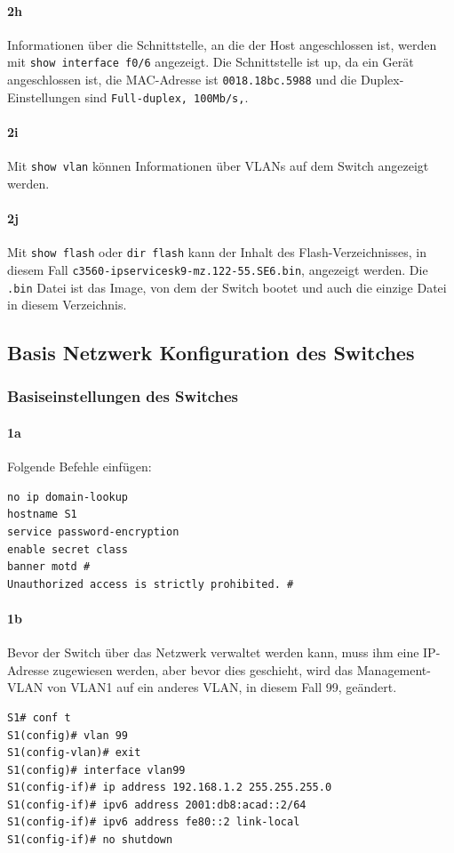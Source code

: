 \documentclass[a4paper]{article}
\newcommand{\abc}{\hfill \break}
\begin{document}
\paragraph{2h} \abc
Informationen über die Schnittstelle, an die der Host angeschlossen ist, werden mit \texttt{show interface f0/6} angezeigt.\abc
Die Schnittstelle ist up, da ein Gerät angeschlossen ist, die MAC-Adresse ist \texttt{0018.18bc.5988} und die Duplex-Einstellungen sind \texttt{Full-duplex, 100Mb/s,}. \abc
\paragraph{2i} \abc
Mit \texttt{show vlan} können Informationen über VLANs auf dem Switch angezeigt werden. \abc
\paragraph{2j} \abc
Mit \texttt{show flash} oder \texttt{dir flash} kann der Inhalt des Flash-Verzeichnisses, in diesem Fall \texttt{c3560-ipservicesk9-mz.122-55.SE6.bin}, angezeigt werden. \abc
Die \texttt{.bin} Datei ist das Image, von dem der Switch bootet und auch die einzige Datei in diesem Verzeichnis.
\subsection{Basis Netzwerk Konfiguration des Switches}
\subsubsection{Basiseinstellungen des Switches}
\paragraph {1a} \abc
Folgende Befehle einfügen:
\begin{lstlisting}
no ip domain-lookup
hostname S1
service password-encryption
enable secret class
banner motd #
Unauthorized access is strictly prohibited. #
\end{lstlisting}
\paragraph {1b} \abc
Bevor der Switch über das Netzwerk verwaltet werden kann, muss ihm eine IP-Adresse zugewiesen werden, aber bevor dies geschieht, wird das Management-VLAN von VLAN1 auf ein anderes VLAN, in diesem Fall 99, geändert.
\begin{lstlisting}
S1# conf t
S1(config)# vlan 99 
S1(config-vlan)# exit
S1(config)# interface vlan99
S1(config-if)# ip address 192.168.1.2 255.255.255.0
S1(config-if)# ipv6 address 2001:db8:acad::2/64
S1(config-if)# ipv6 address fe80::2 link-local
S1(config-if)# no shutdown
\end{lstlisting}
\end{document}
